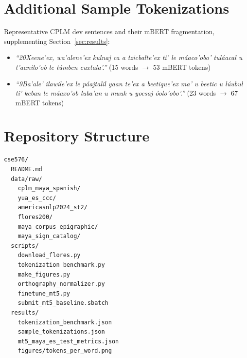 \documentclass[11pt]{article}
\begin{document}



\appendix

\section{Additional Sample Tokenizations}
\label{app:samples}

Representative CPLM dev sentences and their mBERT fragmentation, supplementing
Section~\ref{sec:results}:

\begin{itemize}
\small
\item \textit{``20Xeene'ex, wa'alene'ex kulnaj ca a tzicbalte'ex ti' le
      m\'aaco'obo' tul\'aacal u t'aanilo'ob le t\'umben cuxtala'.''}
      (15 words $\to$ 53 mBERT tokens)
\item \textit{``9Ba'ale' ilawile'ex le p\'aajtalil yaan te'ex a beetique'ex
      ma' u beetic u l\'uubul ti' keban le m\'aaxo'ob luba'an u muuk u
      yocsaj \'oolo'obo'.''} (23 words $\to$ 67 mBERT tokens)
\end{itemize}

\section{Repository Structure}
\label{app:repo}

\begin{verbatim}
cse576/
  README.md
  data/raw/
    cplm_maya_spanish/
    yua_es_ccc/
    americasnlp2024_st2/
    flores200/
    maya_corpus_epigraphic/
    maya_sign_catalog/
  scripts/
    download_flores.py
    tokenization_benchmark.py
    make_figures.py
    orthography_normalizer.py
    finetune_mt5.py
    submit_mt5_baseline.sbatch
  results/
    tokenization_benchmark.json
    sample_tokenizations.json
    mt5_maya_es_test_metrics.json
    figures/tokens_per_word.png
\end{verbatim}
\end{document}
